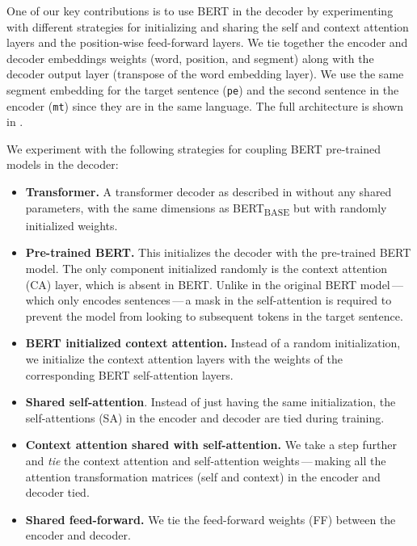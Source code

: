 One of our key contributions is to use BERT in the decoder by
experimenting with different strategies for initializing and sharing the
self and context attention layers and the position-wise feed-forward
layers. We tie together the encoder and decoder embeddings weights
(word, position, and segment) along with the decoder output layer
(transpose of the word embedding layer). We use the same segment
embedding for the target sentence ({\tt pe}) and the second sentence
in the encoder ({\tt mt}) since they are in the same language. The
full architecture is shown in .

We experiment with the following strategies for coupling BERT
pre-trained models in the decoder:
%
\begin{itemize}
    \item \textbf{Transformer.} A transformer decoder as described in
          \citet{vaswani2017attention} without any shared parameters,
          with the same dimensions as BERT\textsubscript{BASE} but with randomly
          initialized weights.
    \item \textbf{Pre-trained BERT.} This initializes the decoder with
          the pre-trained BERT model. The only component initialized randomly
          is the context attention (CA) layer, which is absent in BERT. Unlike
          in the original BERT model\,---\,which only encodes sentences\,---\,a mask in
          the self-attention is required to prevent the model from looking to
          subsequent tokens in the target sentence.
    \item \textbf{ BERT initialized context attention.} Instead of a
          random initialization, we initialize the context attention layers
          with the weights of the corresponding BERT self-attention layers.
    \item \textbf{Shared self-attention}. Instead of just having the same
          initialization, the self-attentions (SA) in the encoder and decoder
          are tied during training.
    \item \textbf{Context attention shared with self-attention.} We take
          a step further and \emph{tie} the context attention and self-attention
          weights\,---\,making all the attention transformation matrices
          (self and context) in the encoder and decoder tied.
    \item \textbf{Shared feed-forward.} We tie the feed-forward weights
          (FF) between the encoder and decoder.
\end{itemize}

